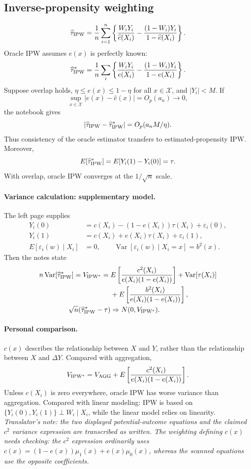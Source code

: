 \subsection{Inverse-propensity weighting}
\[
\widehat\tau_{\rm IPW}=\frac1n\sum_{i=1}^n
\left\{\frac{W_iY_i}{\widehat e(X_i)}-\frac{(1-W_i)Y_i}{1-\widehat e(X_i)}\right\}.
\]
Oracle IPW assumes $e(x)$ is perfectly known:
\[
\widehat\tau^*_{\rm IPW}=\frac1n\sum_i
\left\{\frac{W_iY_i}{e(X_i)}-\frac{(1-W_i)Y_i}{1-e(X_i)}\right\}.
\]
Suppose overlap holds, $\eta\leq e(x)\leq1-\eta$ for all $x\in\mathcal X$, and $|Y_i|<M$. If
\[
\sup_{x\in\mathcal X}|e(x)-\widehat e(x)|=O_p(a_n)\longrightarrow0,
\]
the notebook gives
\[
|\widehat\tau_{\rm IPW}-\widehat\tau^*_{\rm IPW}|=O_p(a_nM/\eta).
\]
Thus consistency of the oracle estimator transfers to estimated-propensity IPW. Moreover,
\[
E[\widehat\tau^*_{\rm IPW}]=E[Y_i(1)-Y_i(0)]=\tau.
\]
With overlap, oracle IPW converges at the $1/\sqrt n$ scale.
\paragraph{Variance calculation: supplementary model.}
The left page supplies
\begin{align*}
Y_i(0)&=c(X_i)-(1-e(X_i))\tau(X_i)+\varepsilon_i(0),\\
Y_i(1)&=c(X_i)+e(X_i)\tau(X_i)+\varepsilon_i(1),\\
E[\varepsilon_i(w)\mid X_i]&=0,\qquad
\operatorname{Var}[\varepsilon_i(w)\mid X_i=x]=b^2(x).
\end{align*}
Then the notes state
\begin{align*}
n\operatorname{Var}[\widehat\tau^*_{\rm IPW}]
=V_{\rm IPW^*}
={}&E\left[\frac{c^2(X_i)}{e(X_i)(1-e(X_i))}\right]
+\operatorname{Var}[\tau(X_i)]\\
&+E\left[\frac{b^2(X_i)}{e(X_i)(1-e(X_i))}\right],\\
\sqrt n(\widehat\tau^*_{\rm IPW}-\tau)&\Rightarrow N(0,V_{\rm IPW^*}).
\end{align*}
\paragraph{Personal comparison.}
$c(x)$ describes the relationship between $X$ and $Y$, rather than the relationship between $X$ and $\Delta Y$. Compared with aggregation,
\[
V_{\rm IPW^*}=V_{\rm AGG}+E\left[\frac{c^2(X_i)}{e(X_i)(1-e(X_i))}\right].
\]
Unless $c(X_i)$ is zero everywhere, oracle IPW has worse variance than aggregation. Compared with linear modeling: IPW is based on $\{Y_i(0),Y_i(1)\}\perp W_i\mid X_i$, while the linear model relies on linearity.
\textit{Translator's note: the two displayed potential-outcome equations and the claimed $c^2$ variance expression are transcribed as written. The weighting defining $c(x)$ needs checking: the $c^2$ expression ordinarily uses $c(x)=(1-e(x))\mu_1(x)+e(x)\mu_0(x)$, whereas the scanned equations use the opposite coefficients.}

